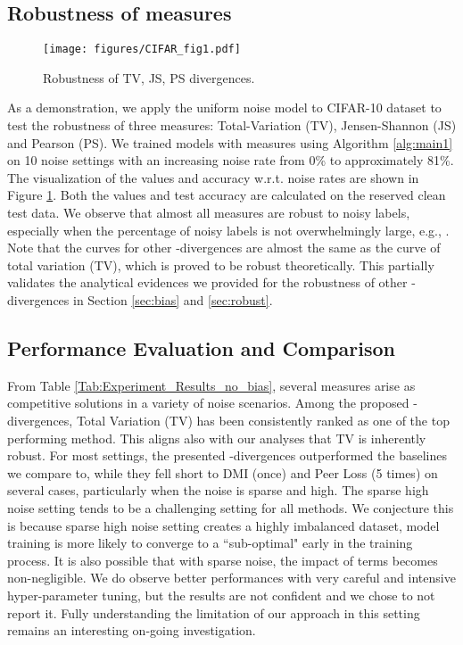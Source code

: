 \subsection{Robustness of  measures}
\begin{figure}[ht]
\vspace{-0.2in}
    \centering
    {\texttt{[image: figures/CIFAR\_fig1.pdf]}
    }
        \vspace{-5pt}
        \caption{Robustness of TV, JS, PS divergences. 
        \vspace{-15pt}
    }
    \label{fig: robust_f_div}
\end{figure}
As a demonstration, we apply the uniform noise model to CIFAR-10 dataset to test the robustness of three  measures: Total-Variation (TV), Jensen-Shannon (JS) and Pearson (PS). We trained models with  measures using Algorithm \ref{alg:main1} on 10 noise settings with an increasing noise rate from 0\% to approximately 81\%. The visualization of the  values and accuracy w.r.t. noise rates are shown in Figure \ref{fig: robust_f_div}. Both the  values and test accuracy are calculated on the reserved clean test data. We observe that almost all  measures are robust to noisy labels, especially when the percentage of noisy labels is not overwhelmingly large, e.g., . Note that the curves for other -divergences are almost the same as the curve of total variation (TV), which is proved to be robust theoretically. This partially validates the analytical evidences we provided for the robustness of other -divergences in Section \ref{sec:bias} and \ref{sec:robust}. 



\subsection{Performance Evaluation and Comparison}

From Table \ref{Tab:Experiment_Results_no_bias}, several  measures arise as competitive solutions in a variety of noise scenarios. Among the proposed -divergences, Total Variation (TV) has been consistently ranked as one of the top performing method. This aligns also with our analyses that TV is inherently robust. For most settings, the presented -divergences outperformed the baselines we compare to, while they fell short to DMI (once) and Peer Loss (5 times) on several cases, particularly when the noise is sparse and high. 
The sparse high noise setting tends to be a challenging setting for all methods. We conjecture this is because sparse high noise setting creates a highly imbalanced dataset, model training is more likely to converge to a ``sub-optimal" early in the training process. It is also possible that with sparse noise, the impact of  terms becomes non-negligible.  We do observe better performances with very careful and intensive hyper-parameter tuning, but the results are not confident and we chose to not report it. Fully understanding the limitation of our approach in this setting remains an interesting on-going investigation. 


